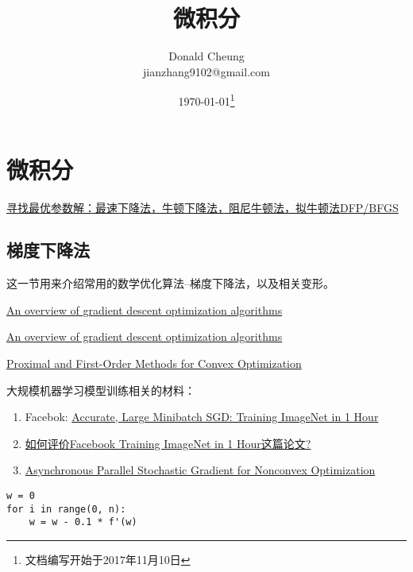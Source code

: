 \ifx\mlbook\undefined
    \providecommand{\pathroot}{../..}

    \title{微积分}
    \author{Donald Cheung\\jianzhang9102@gmail.com}
    \date{\today\footnote{文档编写开始于2017年11月10日}}

    
\fi

\chapter{微积分}
\href{http://dataunion.org/20714.html}{寻找最优参数解：最速下降法，牛顿下降法，阻尼牛顿法，拟牛顿法DFP/BFGS}

\section{梯度下降法}

这一节用来介绍常用的数学优化算法--梯度下降法，以及相关变形。

\href{https://arxiv.org/abs/1609.04747}{An overview of gradient descent optimization algorithms}

\href{http://ruder.io/optimizing-gradient-descent}{An overview of gradient descent optimization algorithms}

\href{https://cs.stanford.edu/~ppasupat/a9online/uploads/proximal_notes.pdf}{Proximal and First-Order Methods for Convex Optimization}


大规模机器学习模型训练相关的材料：
\begin{enumerate}
    \item Facebok: \href{https://arxiv.org/abs/1706.02677}{Accurate, Large Minibatch SGD: Training ImageNet in 1 Hour}
    \item \href{https://www.zhihu.com/question/60874090}{如何评价Facebook Training ImageNet in 1 Hour这篇论文?}
    \item \href{https://arxiv.org/abs/1506.08272}{Asynchronous Parallel Stochastic Gradient for Nonconvex Optimization}
\end{enumerate}


\begin{verbatim}
w = 0
for i in range(0, n):
    w = w - 0.1 * f'(w)
\end{verbatim}

